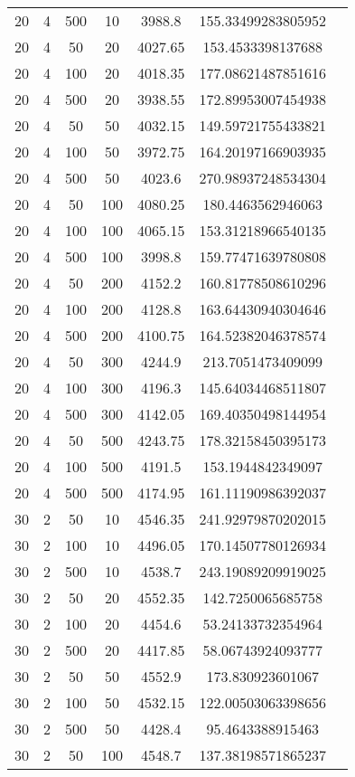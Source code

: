 {\begin{longtabu}{S
S
S
S
S
S[round-mode=places,round-precision=0]
S[round-mode=places,round-precision=0]}
20 & 4 & 500 & 10 & 3988.8 & 155.33499283805952 \\
20 & 4 & 50 & 20 & 4027.65 & 153.4533398137688 \\
20 & 4 & 100 & 20 & 4018.35 & 177.08621487851616 \\
20 & 4 & 500 & 20 & 3938.55 & 172.89953007454938 \\
20 & 4 & 50 & 50 & 4032.15 & 149.59721755433821 \\
20 & 4 & 100 & 50 & 3972.75 & 164.20197166903935 \\
20 & 4 & 500 & 50 & 4023.6 & 270.98937248534304 \\
20 & 4 & 50 & 100 & 4080.25 & 180.4463562946063 \\
20 & 4 & 100 & 100 & 4065.15 & 153.31218966540135 \\
20 & 4 & 500 & 100 & 3998.8 & 159.77471639780808 \\
20 & 4 & 50 & 200 & 4152.2 & 160.81778508610296 \\
20 & 4 & 100 & 200 & 4128.8 & 163.64430940304646 \\
20 & 4 & 500 & 200 & 4100.75 & 164.52382046378574 \\
20 & 4 & 50 & 300 & 4244.9 & 213.7051473409099 \\
20 & 4 & 100 & 300 & 4196.3 & 145.64034468511807 \\
20 & 4 & 500 & 300 & 4142.05 & 169.40350498144954 \\
20 & 4 & 50 & 500 & 4243.75 & 178.32158450395173 \\
20 & 4 & 100 & 500 & 4191.5 & 153.1944842349097 \\
20 & 4 & 500 & 500 & 4174.95 & 161.11190986392037 \\
30 & 2 & 50 & 10 & 4546.35 & 241.92979870202015 \\
30 & 2 & 100 & 10 & 4496.05 & 170.14507780126934 \\
30 & 2 & 500 & 10 & 4538.7 & 243.19089209919025 \\
30 & 2 & 50 & 20 & 4552.35 & 142.7250065685758 \\
30 & 2 & 100 & 20 & 4454.6 & 53.24133732354964 \\
30 & 2 & 500 & 20 & 4417.85 & 58.06743924093777 \\
30 & 2 & 50 & 50 & 4552.9 & 173.830923601067 \\
30 & 2 & 100 & 50 & 4532.15 & 122.00503063398656 \\
30 & 2 & 500 & 50 & 4428.4 & 95.4643388915463 \\
30 & 2 & 50 & 100 & 4548.7 & 137.38198571865237 \\

\end{longtabu}}
